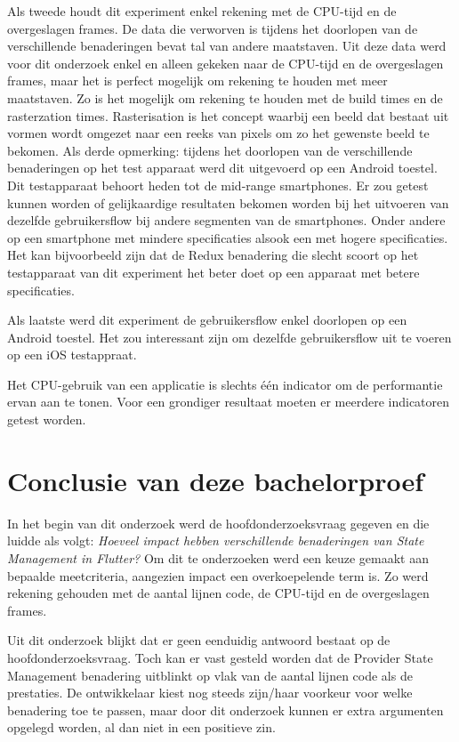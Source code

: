 Als tweede houdt dit experiment enkel rekening met de CPU-tijd en de overgeslagen frames. De data die verworven is tijdens het doorlopen van de verschillende benaderingen bevat tal van andere maatstaven. Uit deze data werd voor dit onderzoek enkel en alleen gekeken naar de CPU-tijd en de overgeslagen frames, maar het is perfect mogelijk om rekening te houden met meer maatstaven. Zo is het mogelijk om rekening te houden met de build times en de rasterzation times. Rasterisation is het concept waarbij een beeld dat bestaat uit vormen wordt omgezet naar een reeks van pixels om zo het gewenste beeld te bekomen. \newline \newline
Als derde opmerking: tijdens het doorlopen van de verschillende benaderingen op het test apparaat werd dit uitgevoerd op een Android toestel. Dit testapparaat behoort heden tot de mid-range smartphones. Er zou getest kunnen worden of gelijkaardige resultaten bekomen worden bij het uitvoeren van dezelfde gebruikersflow bij andere segmenten van de smartphones. Onder andere op een smartphone met mindere specificaties alsook een met hogere specificaties. Het kan bijvoorbeeld zijn dat de Redux benadering die slecht scoort op het testapparaat van dit experiment het beter doet op een apparaat met betere specificaties. 

Als laatste werd dit experiment de gebruikersflow enkel doorlopen op een Android toestel. Het zou interessant zijn om dezelfde gebruikersflow uit te voeren op een iOS testappraat. 

Het CPU-gebruik van een applicatie is slechts één indicator om de performantie ervan aan
te tonen. Voor een grondiger resultaat moeten er meerdere indicatoren getest worden.

\section{Conclusie van deze bachelorproef}
In het begin van dit onderzoek werd de hoofdonderzoeksvraag gegeven en die luidde als volgt: \textit{Hoeveel impact hebben verschillende benaderingen van State Management in Flutter?} Om dit te onderzoeken werd een keuze gemaakt aan bepaalde meetcriteria, aangezien impact een overkoepelende term is. Zo werd rekening gehouden met de aantal lijnen code, de CPU-tijd en de overgeslagen frames. \newline 

Uit dit onderzoek blijkt dat er geen eenduidig antwoord bestaat op de hoofdonderzoeksvraag. Toch kan er vast gesteld worden dat de Provider State Management benadering uitblinkt op vlak van de aantal lijnen code als de prestaties. \newline
De ontwikkelaar kiest nog steeds zijn/haar voorkeur voor welke benadering toe te passen, maar door dit onderzoek kunnen er extra argumenten opgelegd worden, al dan niet in een positieve zin. \newline

